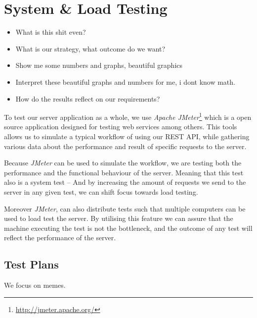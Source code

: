 \chapter{System \& Load Testing}\label{cha:system_and_load_testing}
\begin{itemize}
    \item What is this shit even? \checkmark
    \item What is our strategy, what outcome do we want?
    \item Show me some numbers and graphs, beautiful graphics
    \item Interpret these beautiful graphs and numbers for me, i dont know math.
    \item How do the results reflect on our requirements?
\end{itemize}

To test our server application as a whole, we use \textit{Apache JMeter}\footnote{\url{http://jmeter.apache.org/}} which is a open source application designed for testing web services among others.
This tools allows us to simulate a typical workflow of using our REST API, while gathering various data about the performance and result of specific requests to the server.

Because \textit{JMeter} can be used to simulate the workflow, we are testing both the performance and the functional behaviour of the server.
Meaning that this test also is a system test -- And by increasing the amount of requests we send to the server in any given test, we can shift focus towards load testing.

Moreover \textit{JMeter}, can also distribute tests such that multiple computers can be used to load test the server.
By utilising this feature we can assure that the machine executing the test is not the bottleneck, and the outcome of any test will reflect the performance of the server.

\section{Test Plans}
We focus on memes.


